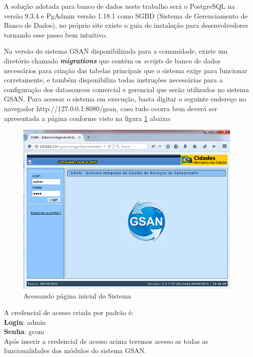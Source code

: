 A solução adotada para banco de dados neste trabalho será o PostgreSQL na versão 9.3.4 e PgAdmin versão 1.18.1 como SGBD (Sistema de Gerenciamento de Banco de Dados), no próprio site existe o guia de instalação para desenvolvedores tornando esse passo bem intuitivo.

Na versão do sistema GSAN disponibilizada para a comunidade, existe um diretório chamado \textbf{\textit{migrations}} que contém os \textit{scripts} de banco de dados necessários para criação das tabelas principais que o sistema exige para funcionar corretamente, e também disponibiliza todas instruções necessárias para a configuração dos datasources comercial e gerencial que serão utilizados no sistema GSAN.
Para acessar o sistema em execução, basta digitar o seguinte endereço no navegador http://127.0.0.1:8080/gsan, caso tudo ocorra bem deverá ser apresentada a página conforme visto na figura \ref{figura:acessoPaginaInicial} abaixo:

\begin{figure}[H]
	\centering
	\caption{Acessando página inicial do Sistema}
	\label{figura:acessoPaginaInicial}	
	\includegraphics{figuras/gsan_online.png}	
\end{figure}


A credencial de acesso criada por padrão é: \\
\textbf{Login}: admin \\
\textbf{Senha}: gcom \\
Após inserir a credencial de acesso acima teremos acesso as todas as funcionalidades dos módulos do sistema GSAN.

